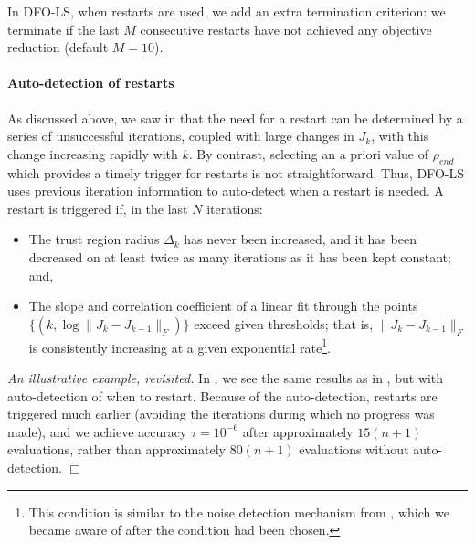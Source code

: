In DFO-LS, when restarts are used, we add an extra termination criterion: we terminate if the last $M$ consecutive restarts have not achieved any objective reduction (default $M=10$).

\paragraph{Auto-detection of restarts} 
As discussed above, we saw in  that the need for a restart can be determined by a series of unsuccessful iterations, coupled with large changes in $J_k$, with this change increasing rapidly with $k$.
By contrast, selecting an a priori value of $\rho_{end}$ which provides a timely trigger for restarts is not straightforward.
Thus, DFO-LS uses previous iteration information to auto-detect when a restart is needed.
A restart is triggered if, in the last $N$ iterations:
\begin{itemize}
	\item The trust region radius $\Delta_k$ has never been increased, and it has been decreased on at least twice as many iterations as it has been kept constant; and,
	\item The slope and correlation coefficient of a linear fit through the points $\{(k, \log\|J_k-J_{k-1}\|_F)\}$ exceed given thresholds; that is, $\|J_k-J_{k-1}\|_F$ is consistently increasing at a given exponential rate\footnote{\:This condition is similar to the noise detection mechanism from \cite{Augustin2014}, which we became aware of after the condition had been chosen.}.
\end{itemize}

{\it An illustrative example, revisited.}
In , we see the same results as in , but with auto-detection of when to restart.
Because of the auto-detection, restarts are triggered much earlier (avoiding the iterations during which no progress was made), and we achieve accuracy $\tau=10^{-6}$ after approximately $15(n+1)$ evaluations, rather than approximately $80(n+1)$ evaluations without auto-detection. $\Box$

